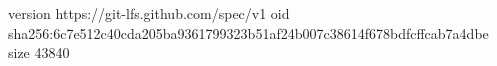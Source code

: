 version https://git-lfs.github.com/spec/v1
oid sha256:6c7e512c40cda205ba9361799323b51af24b007c38614f678bdfcffcab7a4dbe
size 43840
